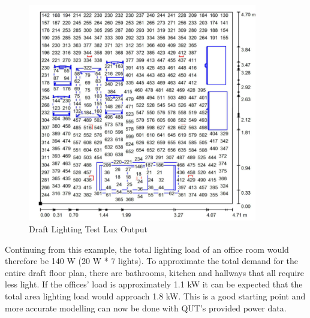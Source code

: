 \begin{figure}[H]
\hfill\includegraphics[width = 100mm]{images/lighting_draft_output}\hspace*{\fill}
\caption{Draft Lighting Test Lux Output} 
\label{fig:DraftLightingLux}
\end{figure} 

Continuing from this example, the total lighting load of an office room would therefore be 140 W (20 W * 7 lights). To approximate the total demand for the entire draft floor plan, there are bathrooms, kitchen and hallways that all require less light. If the offices' load is approximately 1.1 kW it can be expected that the total area lighting load would approach 1.8 kW. This is a good starting point and more accurate modelling can now be done with QUT's provided power data. 